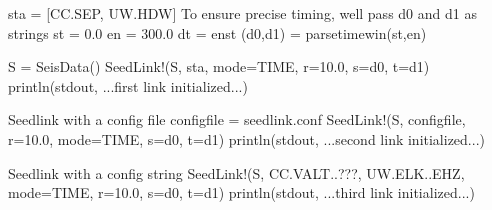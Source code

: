 \documentclass[letterpaper,11pt,english]{sphinxmanual}
\begin{document}
\begin{sphinxVerbatim}[commandchars=\\\{\}]
sta = [\PYGZdq{}CC.SEP\PYGZdq{}, \PYGZdq{}UW.HDW\PYGZdq{}]
\PYGZsh{} To ensure precise timing, we\PYGZsq{}ll pass d0 and d1 as strings
st = 0.0
en = 300.0
dt = en\PYGZhy{}st
(d0,d1) = parsetimewin(st,en)

S = SeisData()
SeedLink!(S, sta, mode=\PYGZdq{}TIME\PYGZdq{}, r=10.0, s=d0, t=d1)
println(stdout, \PYGZdq{}...first link initialized...\PYGZdq{})

\PYGZsh{} Seedlink with a config file
config\PYGZus{}file = \PYGZdq{}seedlink.conf\PYGZdq{}
SeedLink!(S, config\PYGZus{}file, r=10.0, mode=\PYGZdq{}TIME\PYGZdq{}, s=d0, t=d1)
println(stdout, \PYGZdq{}...second link initialized...\PYGZdq{})

\PYGZsh{} Seedlink with a config string
SeedLink!(S, \PYGZdq{}CC.VALT..???, UW.ELK..EHZ\PYGZdq{}, mode=\PYGZdq{}TIME\PYGZdq{}, r=10.0, s=d0, t=d1)
println(stdout, \PYGZdq{}...third link initialized...\PYGZdq{})
\end{sphinxVerbatim}



\renewcommand{\indexname}{Index}
\printindex
\end{document}
